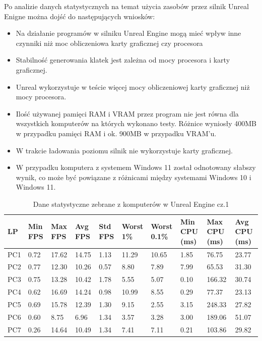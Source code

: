 \documentclass[12pt,twoside]{article}
\begin{document}
Po analizie danych statystycznych na temat użycia zasobów przez silnik Unreal
Enigne można dojść do następujących wniosków:
\begin{itemize}
\item Na działanie programów w silniku Unreal Engine mogą mieć wpływ inne
czynniki niż moc obliczeniowa karty graficznej czy procesora
\item Stabilność generowania klatek jest zależna od mocy procesora i karty
graficznej.
\item Unreal wykorzystuje w teście więcej mocy obliczeniowej karty graficznej
niż mocy procesora. 
\item Ilość używanej pamięci RAM i VRAM przez program nie jest równa dla
wszystkich komputerów na których wykonano testy. Różnice wyniosły 400MB w
przypadku pamięci RAM i ok. 900MB w przypadku VRAM’u.
\item W trakcie ładowania poziomu silnik nie wykorzystuje karty graficznej. 
\item W przypadku komputera z systemem Windows 11 został odnotowany słabszy
wynik, co może być powiązane z różnicami między systemami Windows 10 i Windows
11. 
\end{itemize}


\begin{table}[ht]
    \caption{Dane statystyczne zebrane z komputerów w Unreal Engine cz.1}
    \centering		
        \begin{tabular}{|p{1cm}|p{1cm}|p{1cm}|p{1cm}|p{1cm}|p{1cm}|p{1cm}|p{1cm}|p{}|p{1cm}|}	
            \hline
            LP & Min FPS & Max FPS & Avg FPS & Std FPS & Worst 1\% & Worst 0.1\% & Min CPU (ms) & Max CPU (ms)  & Avg CPU (ms) \\
            \hline
            PC1 &0.72 & 17.62 & 14.75 & 1.13 & 11.29 & 10.65 & 1.85 & 76.75 & 23.77  \\	
            \hline
            PC2 & 0.77 & 12.30 & 10.26 & 0.57 & 8.80 & 7.89 & 7.99 & 65.53 & 31.30 \\
            \hline
            PC3 & 0.75 & 13.28 & 10.42 & 1.78 & 5.55 & 5.07 & 0.10 & 166.32 & 30.74  \\
            \hline
            PC4 & 0.62 & 16.69 & 14.24 & 0.98 & 10.99 & 8.55 & 0.29 & 77.37 & 23.13  \\
            \hline
            PC5 & 0.69 & 15.78 & 12.39 & 1.30 & 9.15 & 2.55 & 3.15 & 248.33 & 27.82  \\
            \hline
            PC6 & 0.60 & 8.75 & 6.96 & 1.34 & 3.57 & 3.28 & 3.00 & 189.06 & 51.07  \\
            \hline
            PC7 & 0.26 & 14.64 & 10.49 & 1.34 & 7.41 & 7.11 & 0.21 & 103.86 & 29.82 \\
            \hline

        \end{tabular}	
    \label{Tabela:StatystykiUnreal1}
    \end{table}	
\end{document}
